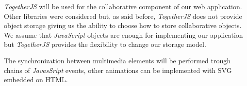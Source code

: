 \emph{TogetherJS} will be used for the collaborative component of our web application. Other libraries were considered but, as said before, \emph{TogetherJS} does not provide object storage giving us the ability to choose how to store collaborative objects. We assume that \emph{JavaScript} objects are enough for implementing our application but \emph{TogetherJS} provides the flexibility to change our storage model.

The synchronization between multimedia elements will be performed trough chains of \emph{JavasSript} events, other animations can be implemented with \ac{SVG} embedded on \ac{HTML}.
